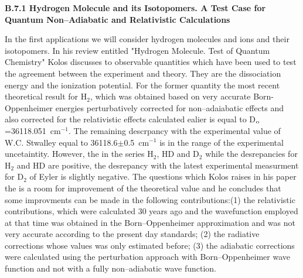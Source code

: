 {{\vspace{2mm}
\noindent
{\bf B.7.1 Hydrogen Molecule and its Isotopomers. A Test
Case for Quantum Non--Adiabatic and Relativistic Calculations}



In the first applications 
we will consider
hydrogen molecules and ions and their isotopomers.
In his review entitled "Hydrogen Molecule. Test of Quantum Chemistry"
\cite{kk} Kolos discusses to observable quantities which have
been used to test the agreement between the experiment and theory.
They are the dissociation energy and the ionization potential.
For the former quantity the most recent theoretical result
for H$_2$, which was obtained based on very accurate Born-Oppenheimer
energies perturbatively corrected for non--adaiabatic effects
and also corrected for the relativistic effects calculated
ealier is equal to D$_{\rm o}$=36118.051~cm$^{-1}$. The remaining
descrpancy with the experimental value of W.C. Stwalley\cite{k29}
equal to 36118.6$\pm$0.5~cm$^{-1}$ is in the range of the
experimental uncetaintity.
However, the in the series H$_2$, HD and D$_2$ while the
desrepancies for H$_2$ and HD are positive, the desrepancy
with the latest experimental measurment for D$_2$ of
Eyler\cite{k42,k42p}
is slightly negative.
The questions which Kolos raises
in his paper the is a room for improvement of the theoretical
value and he concludes that some improvments can be made
in the following contributions:(1) the relativistic contributions,
which were calculated 30 years ago and the wavefunction
employed at that time was obtained in the Born--Oppenheimer
approximation and was not very accurate according to the present
day standards; (2) the radiative corrections whose values
was only estimated before\cite{k16}; (3) the adiabatic corrections
were calculated using the perturbation approach with Born--Oppenheimer
wave function and not with a fully non--adiabatic wave function.

}}

